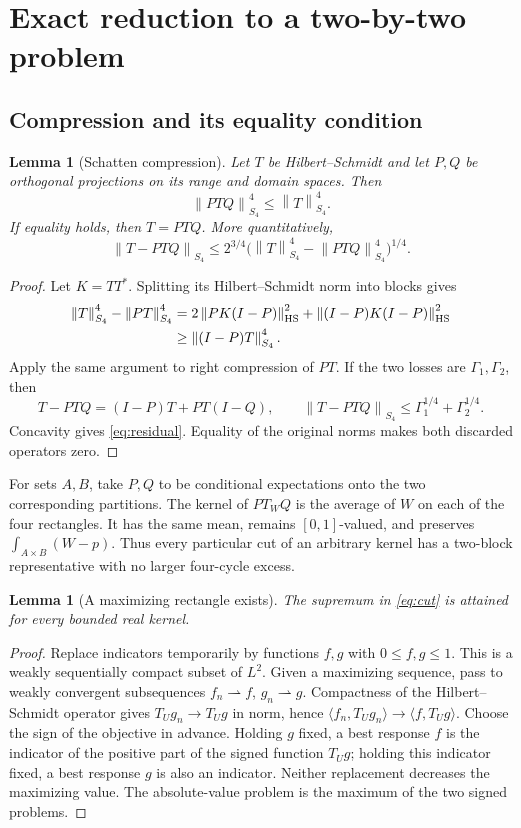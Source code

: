 \documentclass[11pt]{article}
\newtheorem{lemma}[theorem]{Lemma}
\theoremstyle{definition}
\newcommand{\1}{\mathbf 1}
\newcommand{\Sfour}[1]{\left\|#1\right\|_{S_4}}
\newcommand{\HS}[1]{\left\|#1\right\|_{\mathrm{HS}}}
\begin{document}
\section{Exact reduction to a two-by-two problem}\label{sec:compression}
\subsection{Compression and its equality condition}
\begin{lemma}[Schatten compression]\label{lem:compression}
Let $T$ be Hilbert--Schmidt and let $P,Q$ be orthogonal projections on its range and domain spaces. Then
\[
 \Sfour{PTQ}^4\le\Sfour{T}^4.
\]
If equality holds, then $T=PTQ$. More quantitatively,
\begin{equation}\label{eq:residual}
 \Sfour{T-PTQ}\le 2^{3/4}
   \bigl(\Sfour{T}^4-\Sfour{PTQ}^4\bigr)^{1/4}.
\end{equation}
\end{lemma}
\begin{proof}
Let $K=TT^*$. Splitting its Hilbert--Schmidt norm into blocks gives
\begin{align}
 \Sfour{T}^4-\Sfour{PT}^4
 &=2\HS{PK(I-P)}^2+\HS{(I-P)K(I-P)}^2\notag\\
 &\ge\Sfour{(I-P)T}^4.\label{eq:projectionloss}
\end{align}
Apply the same argument to right compression of $PT$. If the two losses are $\Gamma_1,\Gamma_2$, then
\[
 T-PTQ=(I-P)T+PT(I-Q),\qquad
 \Sfour{T-PTQ}\le\Gamma_1^{1/4}+\Gamma_2^{1/4}.
\]
Concavity gives \eqref{eq:residual}. Equality of the original norms makes both discarded operators zero.
\end{proof}

For sets $A,B$, take $P,Q$ to be conditional expectations onto the two corresponding partitions. The kernel of $PT_WQ$ is the average of $W$ on each of the four rectangles. It has the same mean, remains $[0,1]$-valued, and preserves $\int_{A\times B}(W-p)$. Thus every particular cut of an arbitrary kernel has a two-block representative with no larger four-cycle excess.

\begin{lemma}[A maximizing rectangle exists]\label{lem:cutattain}
The supremum in \eqref{eq:cut} is attained for every bounded real kernel.
\end{lemma}
\begin{proof}
Replace indicators temporarily by functions $f,g$ with $0\le f,g\le1$. This is a weakly sequentially compact subset of $L^2$. Given a maximizing sequence, pass to weakly convergent subsequences $f_n\rightharpoonup f$, $g_n\rightharpoonup g$. Compactness of the Hilbert--Schmidt operator gives $T_Ug_n\to T_Ug$ in norm, hence $\langle f_n,T_Ug_n\rangle\to\langle f,T_Ug\rangle$. Choose the sign of the objective in advance. Holding $g$ fixed, a best response $f$ is the indicator of the positive part of the signed function $T_Ug$; holding this indicator fixed, a best response $g$ is also an indicator. Neither replacement decreases the maximizing value. The absolute-value problem is the maximum of the two signed problems.
\end{proof}
\end{document}
